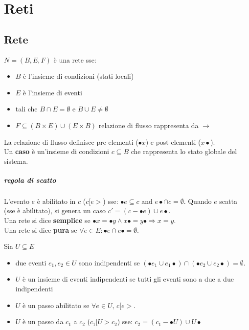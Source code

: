\chapter{Reti}

\section{Rete}

$N = (B, E, F)$ \`e una rete sse:
\begin{itemize}
  \item $B$ \`e l'insieme di condizioni (stati locali)
  \item $E$ \`e l'insieme di eventi
  \item tali che $B \cap E = \emptyset$ e $B \cup E \neq \emptyset$
  \item $F \subseteq (B \times E) \cup (E \times B)$ relazione di flusso rappresenta da $\rightarrow$
\end{itemize}

La relazione di flusso definisce pre-elementi ($\bullet x$) e post-elementi ($x \bullet$). \\

Un \textbf{caso} \`e un'insieme di condizioni $c \subseteq B$ che rappresenta lo stato globale del sistema.

\paragraph{regola di scatto}

L'evento $e$ \`e abilitato in $c$ ($c[e>$) sse: $\bullet e \subseteq c$ and $e \bullet \cap c = \emptyset$.
Quando $e$ scatta (sse \`e abilitato), si genera un caso $c' = (c - \bullet e) \cup e \bullet$. \\

Una rete si dice \textbf{semplice} se $\bullet x = \bullet y \land x \bullet = y \bullet \Rightarrow x = y$.\\

Una rete si dice \textbf{pura} se $\forall e \in E : \bullet e \cap e \bullet = \emptyset$.

Sia $U \subseteq E$
\begin{itemize}
  \item due eventi $e_1,e_2 \in U$ sono indipendenti se $(\bullet e_1 \cup e_1 \bullet) \cap (\bullet e_2 \cup e_2 \bullet) = \emptyset$.
  \item $U$ \`e un insieme di eventi indipendenti se tutti gli eventi sono a due a due indipendenti
  \item $U$ \`e un passo abilitato se $\forall e \in U$, $c[e>$.
  \item $U$ \`e un passo da $c_1$ a $c_2$ ($c_1[U>c_2$) sse: $c_2 = (c_1 - \bullet U) \cup U \bullet$
\end{itemize}

